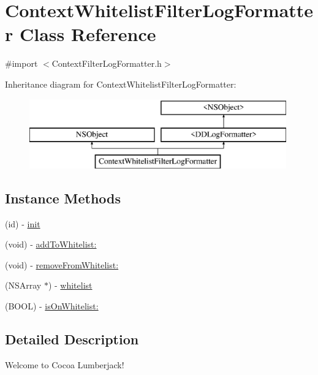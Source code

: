 \hypertarget{interface_context_whitelist_filter_log_formatter}{\section{Context\-Whitelist\-Filter\-Log\-Formatter Class Reference}
\label{interface_context_whitelist_filter_log_formatter}
}


{\ttfamily \#import $<$Context\-Filter\-Log\-Formatter.\-h$>$}

Inheritance diagram for Context\-Whitelist\-Filter\-Log\-Formatter\-:\begin{figure}[H]
\begin{center}
\leavevmode
\includegraphics[height=3.000000cm]{interface_context_whitelist_filter_log_formatter}
\end{center}
\end{figure}
\subsection*{Instance Methods}
\begin{DoxyCompactItemize}
\item 
(id) -\/ \hyperlink{interface_context_whitelist_filter_log_formatter_a9e4de0486a35878a38118d1e4d82039a}{init}
\item 
(void) -\/ \hyperlink{interface_context_whitelist_filter_log_formatter_ae9012af9ee5a0cb907cc81ca2195d377}{add\-To\-Whitelist\-:}
\item 
(void) -\/ \hyperlink{interface_context_whitelist_filter_log_formatter_abf48d53a2e4e7e0e780112c80360baf4}{remove\-From\-Whitelist\-:}
\item 
(N\-S\-Array $\ast$) -\/ \hyperlink{interface_context_whitelist_filter_log_formatter_ad5e062d7d83b5cd7db6426e4b79e295e}{whitelist}
\item 
(B\-O\-O\-L) -\/ \hyperlink{interface_context_whitelist_filter_log_formatter_a76f331b90217ff7ecab3b17751a4536f}{is\-On\-Whitelist\-:}
\end{DoxyCompactItemize}


\subsection{Detailed Description}
Welcome to Cocoa Lumberjack!

